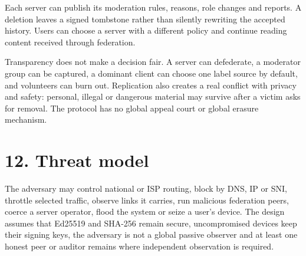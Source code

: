 \documentclass[12pt,a4paper]{article}
\begin{document}
Each server can publish its moderation rules, reasons, role changes and reports. A deletion leaves a signed tombstone rather than silently rewriting the accepted history. Users can choose a server with a different policy and continue reading content received through federation.

Transparency does not make a decision fair. A server can defederate, a moderator group can be captured, a dominant client can choose one label source by default, and volunteers can burn out. Replication also creates a real conflict with privacy and safety: personal, illegal or dangerous material may survive after a victim asks for removal. The protocol has no global appeal court or global erasure mechanism.

\section*{12. Threat model}
The adversary may control national or ISP routing, block by DNS, IP or SNI, throttle selected traffic, observe links it carries, run malicious federation peers, coerce a server operator, flood the system or seize a user's device. The design assumes that Ed25519 and SHA-256 remain secure, uncompromised devices keep their signing keys, the adversary is not a global passive observer and at least one honest peer or auditor remains where independent observation is required.
\end{document}
